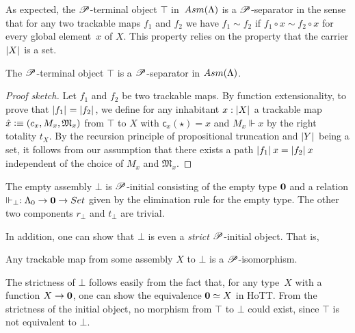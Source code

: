 \documentclass[a4paper,UKenglish,numberwithinsect,cleveref,thm-restate,draft]{lipics-v2021}
\numberwithin{equation}{section}
\theoremstyle{definition}
\theoremstyle{plain}
\begin{document}
As expected, the $\mathscr{P}$-terminal object $\top$ in~$\Asm(\Lambda)$ is a $\mathscr{P}$-separator in the sense that for any two trackable maps $f_1$ and $f_2$ we have $f_1 \sim f_2$ if $f_1 \circ x \sim f_2 \circ x$ for every global element~$x$ of $X$.
This property relies on the property that the carrier $\mathopen{}\left|X\right|_{}^{}\mathclose{}$ is a set.
\begin{proposition}
  The $\mathscr{P}$-terminal object $\top$ is a $\mathscr{P}$-separator in $\Asm(\Lambda)$.
\end{proposition}
\begin{proof}[Proof sketch]
  Let $f_1$ and $f_2$ be two trackable maps.
  By function extensionality, to prove that $\mathopen{}\left|f_1\right|_{}^{}\mathclose{} = \mathopen{}\left|f_2\right|_{}^{}\mathclose{}$, we define for any inhabitant $x : \mathopen{}\left|X\right|_{}^{}\mathclose{}$ a trackable map $\hat{x} \defeq (\mathsf{c}_x, M_x, \mathfrak{M}_x)$ from $\top$ to $X$  with $\mathsf{c}_x(\star) = x$ and $M_x \Vdash x$ by the right totality $t_X$.
  By the recursion principle of propositional truncation and $\mathopen{}\left|Y\right|_{}^{}\mathclose{}$ being a set, it follows from our assumption that there exists a path $\mathopen{}\left|f_1\right|_{}^{}\mathclose{}\,x = \mathopen{}\left|f_2\right|_{}^{}\mathclose{}\, x$ independent of the choice of $M_x$ and $\mathfrak{M}_x$.
\end{proof}

\begin{example}
The empty assembly $\bot$ is $\mathscr{P}$-initial consisting of the empty type $\mathbf{0}$ and a relation $\Vdash_\bot : \Lambda_0 \to \Empty \to \set$ given by the elimination rule for the empty type.
The other two components $r_\bot$ and $t_\bot$ are trivial.
\end{example}

In addition, one can show that $\bot$ is even a \emph{strict} $\mathscr{P}$-initial object. That is, 
\begin{proposition}\label{prop:strict-initial}
  Any trackable map from some assembly $X$ to $\bot$ is a $\mathscr{P}$-isomorphism. 
\end{proposition}
The strictness of $\bot$ follows easily from the fact that, for any type~$X$ with a function $X \to \mathbf{0}$, one can show the equivalence $\mathbf{0} \simeq X$ in HoTT.
From the strictness of the initial object, no morphism from $\top$ to $\bot$ could exist, since $\top$ is not equivalent to $\bot$.
\end{document}
